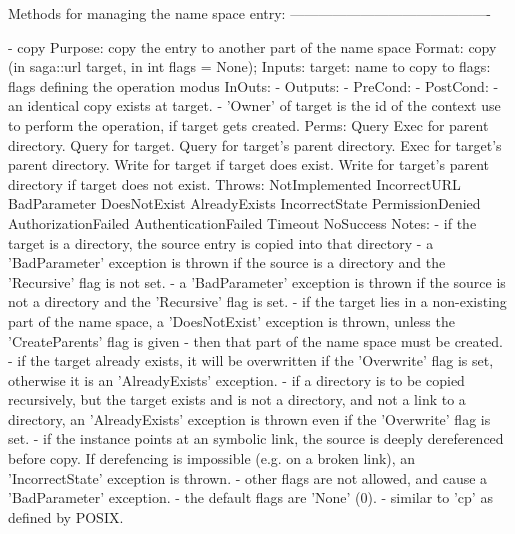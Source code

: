\begin{myspec}
    Methods for managing the name space entry:
    -------------------------------------------
 
    - copy
      Purpose:  copy the entry to another part of the name space
      Format:   copy               (in  saga::url target,
                                    in  int       flags = None);
      Inputs:   target:             name to copy to
                flags:              flags defining the operation
                                    modus
      InOuts:   -
      Outputs:  -
      PreCond:  -
      PostCond: - an identical copy exists at target.
                - 'Owner' of target is the id of the context
                  use to perform the operation, if target gets
                  created.
      Perms:    Query 
                Exec  for parent directory.
                Query for target.
                Query for target's parent directory.
                Exec  for target's parent directory.
                Write for target
                      if  target does exist.
                Write for target's parent directory 
                      if  target does not exist.
      Throws:   NotImplemented
                IncorrectURL
                BadParameter
                DoesNotExist
                AlreadyExists
                IncorrectState
                PermissionDenied
                AuthorizationFailed
                AuthenticationFailed
                Timeout
                NoSuccess
      Notes:    - if the target is a directory, the source entry
                  is copied into that directory
                - a 'BadParameter' exception is thrown if the 
                  source is a directory and the 'Recursive' flag 
                  is not set.
                - a 'BadParameter' exception is thrown if the 
                  source is not a directory and the 'Recursive' 
                  flag is set.
                - if the target lies in a non-existing part of
                  the name space, a 'DoesNotExist' exception is
                  thrown, unless the 'CreateParents' flag is
                  given - then that part of the name space must
                  be created.
                - if the target already exists, it will be
                  overwritten if the 'Overwrite' flag is set,
                  otherwise it is an 'AlreadyExists' exception.
                - if a directory is to be copied recursively,
                  but the target exists and is not a directory,
                  and not a link to a directory, an
                  'AlreadyExists' exception is thrown even if
                  the 'Overwrite' flag is set. 
                - if the instance points at an symbolic link, 
                  the source is deeply dereferenced before copy.
                  If derefencing is impossible (e.g. on a broken 
                  link), an 'IncorrectState' exception is thrown.
                - other flags are not allowed, and cause a
                  'BadParameter' exception.
                - the default flags are 'None' (0).
                - similar to 'cp' as defined by POSIX.
 

\end{myspec}
